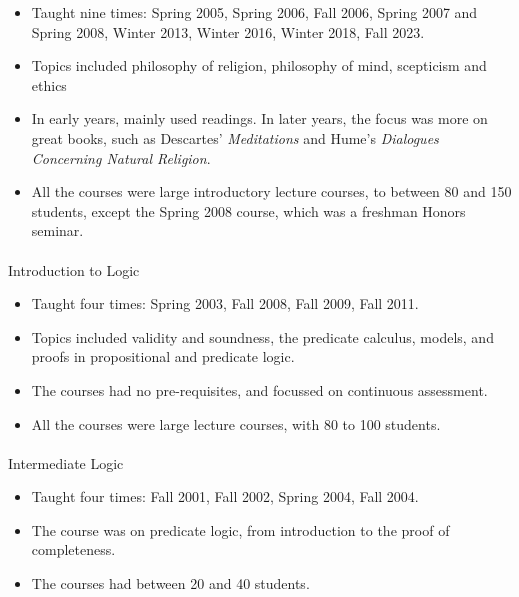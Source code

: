 \documentclass[
  10pt,
  letterpaper,
  DIV=11,
  numbers=noendperiod,
  twoside]{scrartcl}
\makeatletter
\let\oldparagraph\paragraph
\renewcommand{\paragraph}{
    \@ifstar
      \xxxParagraphStar
      \xxxParagraphNoStar
  }
\newcommand{\xxxParagraphStar}[1]{\oldparagraph*{#1}\mbox{}}
\newcommand{\xxxParagraphNoStar}[1]{\oldparagraph{#1}\mbox{}}
\providecommand{\tightlist}{%
  \setlength{\itemsep}{0pt}\setlength{\parskip}{0pt}}\usepackage{longtable,booktabs,array}
\makeatother
\begin{document}
\begin{itemize}
\tightlist
\item
  Taught nine times: Spring 2005, Spring 2006, Fall 2006, Spring 2007
  and Spring 2008, Winter 2013, Winter 2016, Winter 2018, Fall 2023.
\item
  Topics included philosophy of religion, philosophy of mind, scepticism
  and ethics
\item
  In early years, mainly used readings. In later years, the focus was
  more on great books, such as Descartes' \emph{Meditations} and Hume's
  \emph{Dialogues Concerning Natural Religion}.
\item
  All the courses were large introductory lecture courses, to between 80
  and 150 students, except the Spring 2008 course, which was a freshman
  Honors seminar.
\end{itemize}

\paragraph{Introduction to Logic}\label{introduction-to-logic}

\begin{itemize}
\tightlist
\item
  Taught four times: Spring 2003, Fall 2008, Fall 2009, Fall 2011.
\item
  Topics included validity and soundness, the predicate calculus,
  models, and proofs in propositional and predicate logic.
\item
  The courses had no pre-requisites, and focussed on continuous
  assessment.
\item
  All the courses were large lecture courses, with 80 to 100 students.
\end{itemize}

\paragraph{Intermediate Logic}\label{intermediate-logic}

\begin{itemize}
\tightlist
\item
  Taught four times: Fall 2001, Fall 2002, Spring 2004, Fall 2004.
\item
  The course was on predicate logic, from introduction to the proof of
  completeness.
\item
  The courses had between 20 and 40 students.
\end{itemize}
\end{document}
